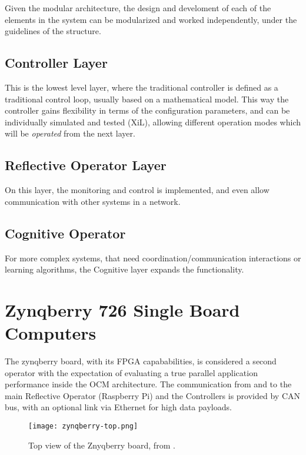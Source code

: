 Given the modular architecture, the design and develoment of each of the elements in the system can be modularized and worked independently, under the guidelines of the structure.

\subsection*{Controller Layer}

This is the lowest level layer, where the traditional controller is defined as a traditional control loop, usually based on a mathematical model. This way the controller gains flexibility in terms of the configuration parameters, and can be individually simulated and tested (XiL), allowing different operation modes which will be \textit{operated} from the next layer.

\subsection*{Reflective Operator Layer}

On this layer, the monitoring and control is implemented, and even allow communication with other systems in a network.

\subsection*{Cognitive Operator}

For more complex systems, that need coordination/communication interactions or learning algorithms, the Cognitive layer expands the functionality.

\section{Zynqberry 726 Single Board Computers}

The zynqberry board, with its FPGA capababilities, is considered a second operator with the expectation of evaluating a true parallel application performance inside the OCM architecture. The communication from and to the main Reflective Operator (Raspberry Pi) and the Controllers is provided by CAN bus, with an optional link via Ethernet for high data payloads.

\begin{figure}[htp]
	\centering
	\texttt{[image: zynqberry-top.png]}
	\caption{Top view of the Znyqberry board, from \cite{zynq-main}.} \label{fig:znyqtop}
\end{figure}

